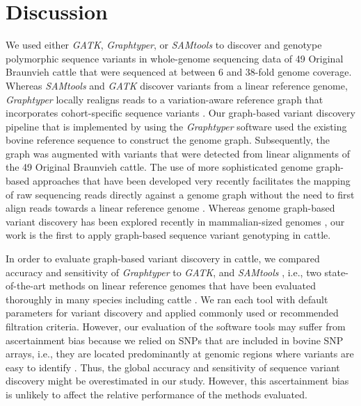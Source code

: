 \documentclass[../main.tex]{subfiles}
\begin{document}
\section{Discussion}

We used either \emph{GATK}, \emph{Graphtyper}, or \emph{SAMtools} to discover and genotype polymorphic sequence variants in whole-genome sequencing data of 49 Original Braunvieh cattle that were sequenced at between 6 and 38-fold genome coverage. 
Whereas \emph{SAMtools} and \emph{GATK} discover variants from a linear reference genome, \emph{Graphtyper} locally realigns reads to a variation-aware reference graph that incorporates cohort-specific sequence variants \citep{eggertsson2017graphtyper}. 
Our graph-based variant discovery pipeline that is implemented by using the \emph{Graphtyper} software used the existing bovine reference sequence to construct the genome graph. 
Subsequently, the graph was augmented with variants that were detected from linear alignments of the 49 Original Braunvieh cattle. 
The use of more sophisticated genome graph-based approaches that have been developed very recently facilitates the mapping of raw sequencing reads directly against a genome graph without the need to first align reads towards a linear reference genome \citep{garrison2018variation}. 
Whereas genome graph-based variant discovery has been explored recently in mammalian-sized genomes \citep{dilthey2015improved,rakocevic2019fast,garrison2018variation,sibbesen2018accurate}, our work is the first to apply graph-based sequence variant genotyping in cattle.

In order to evaluate graph-based variant discovery in cattle, we compared accuracy and sensitivity of \emph{Graphtyper} to \emph{GATK}, and \emph{SAMtools} , i.e., two state-of-the-art methods on linear reference genomes that have been evaluated thoroughly in many species including cattle \citep{Jansen2013,baes2014evaluation}. 
We ran each tool with default parameters for variant discovery and applied commonly used or recommended filtration criteria. 
However, our evaluation of the software tools may suffer from ascertainment bias because we relied on SNPs that are included in bovine SNP arrays, i.e., they are located predominantly at genomic regions where variants are easy to identify \citep{li2014toward,malomane2018efficiency,linderman2014analytical}. 
Thus, the global accuracy and sensitivity of sequence variant discovery might be overestimated in our study. 
However, this ascertainment bias is unlikely to affect the relative performance of the methods evaluated.
\end{document}

